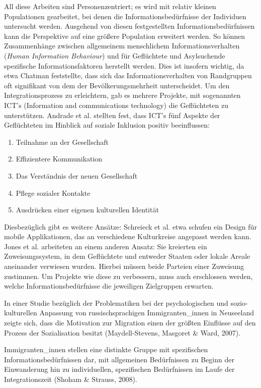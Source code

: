 All diese Arbeiten sind Personenzentriert; es wird mit relativ kleinen Populationen gearbeitet, bei denen die Informationsbedürfnisse der Individuen untersucht werden. Ausgehend von diesen festgestellten Informationsbedürfnissen kann die Perspektive auf eine größere Population erweitert werden. So können Zusammenhänge zwischen allgemeinem menschlichem Informationsverhalten (\textit{Human Information Behaviour}) und für Geflüchtete und Asylsuchende spezifische Informationsfaktoren herstellt werden.\cite{oduntan2017investigating}\newline
Dies ist insofern wichtig, da etwa Chatman feststellte, dass sich das Informationsverhalten von Randgruppen oft signifikant von dem der Bev\"olkerungsmehrheit unterscheidet. \cite{chatman1996impoverished}
\newline
\newline 
Um den Integrationsprozess zu erleichtern, gab es mehrere Projekte, mit sogenannten ICT's (Information and communications technology) die Geflüchteten zu unterstützen. Andrade et al. stellten fest, dass ICT's  f\"unf Aspekte der Gefl\"uchteten im Hinblick auf soziale Inklusion positiv beeinflussen:
\begin{enumerate}
    \item   Teilnahme an der Gesellschaft
    \item   Effizientere Kommunikation
    \item   Das Verst\"andnis der neuen Gesellschaft
    \item   Pflege sozialer Kontakte
    \item   Ausdr\"ucken einer eigenen kulturellen Identit\"at
\end{enumerate}
Diesbez\"uglich gibt es weitere Ans\"atze:\newline
Schreieck et al. etwa schufen ein Design f\"ur mobile Applikationen, das an verschiedene Kulturkreise angepasst werden kann. \cite{schreieck2017supporting}\newline
Jones et al. arbeiteten an einem anderen Ansatz: Sie kreierten ein Zuweisungssystem, in dem Gefl\"uchtete und entweder Staaten oder lokale Areale aneinander verwiesen wurden. Hierbei m\"ussen beide Parteien einer Zuweisung zustimmen. \cite{jones2017matching}\newline
Um Projekte wie diese zu verbessern, muss auch erschlossen werden, welche Informationsbed\"urfnisse die jeweiligen Zielgruppen erwarten.\newline

In einer Studie bezüglich der Problematiken bei der
psychologischen und sozio-kulturellen Anpassung von russischsprachigen Immigranten_innen in Neuseeland zeigte sich, dass
die Motivation zur Migration einen der größten Einflüsse auf den Prozess
der Sozialisation besitzt (Maydell-Stevens, Masgoret & Ward, 2007).

Immigranten_innen stellen eine distinkte Gruppe mit spezifischen
Informationsbedürfnissen dar, mit allgemeinen Bedürfnissen zu Beginn
der Einwanderung hin zu individuellen, spezifischen Bedürfnissen im
Laufe der Integrationszeit (Shoham & Strauss, 2008).